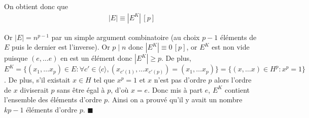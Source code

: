 \documentclass{article}
\newcommand*{\QED}{\hfill\ensuremath{\blacksquare}}%
\begin{document}
On obtient donc que 
\begin{align*}
	|E| \equiv |E^K| \, [p]
\end{align*}

Or $|E| = n^{p-1}$ par un simple argument combinatoire (au choix $p-1$ éléments de $E$ puis le dernier est l'inverse). Or $p\mid n$ donc $|E^{K}| \equiv 0\, [p]$, or $E^K$ est non vide puisque $(e,\ldots e)$ en est un élément donc $|E^K|\geq p$. De plus, $E^K  =\{(x_1,\ldots x_p) \in E : \forall c'\in \langle c \rangle, (x_{c'(1)},\ldots x_{c'(p)}) = (x_1,\ldots x_p)\} = \{(x,\ldots x)\in H^p  : x^p = 1\}$. De plus, s'il existait $x\in H$ tel que $x^p = 1$ et $x$ n'est pas d'ordre $p$ alors l'ordre de $x$ diviserait $p$ sans être égal à $p$, d'où $x = e$. Donc mis à part $e$, $E^K$ contient l'ensemble des éléments d'ordre $p$. Ainsi on a prouvé qu'il y avait un nombre $kp-1$ éléments d'ordre $p$.
\QED
\end{document}
